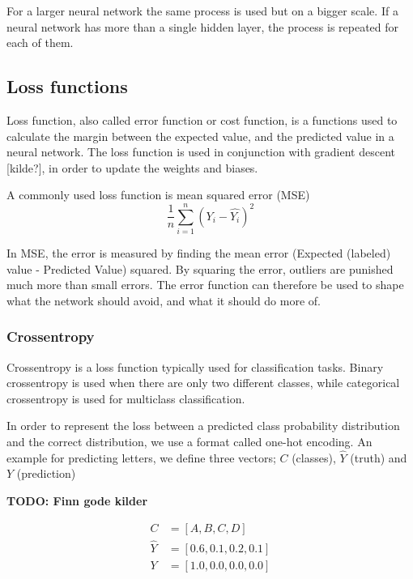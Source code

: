 For a larger neural network the same process is used but on a bigger scale. If a neural network has more than a single hidden layer, the process is repeated for each of them.

\subsection{Loss functions}
\label{loss_function}

Loss function, also called error function or cost function, is a functions used to calculate the margin between the expected value, and the predicted value in a neural network. The loss function is used in conjunction with gradient descent [kilde?], in order to update the weights and biases.

A commonly used loss function is mean squared error (MSE)
\begin{equation}
    \frac{1}{n} \sum^n_{i=1} (Y_i - \hat{Y_i})^2
\end{equation}

In MSE, the error is measured by finding the mean error (Expected (labeled) value - Predicted Value) squared. By squaring the error, outliers are punished much more than small errors. The error function can therefore be used to shape what the network should avoid, and what it should do more of.

\subsubsection{Crossentropy}
\label{categorical-crossentropy}

Crossentropy is a loss function typically used for classification tasks. Binary crossentropy is used when there are only two different classes, while categorical crossentropy is used for multiclass classification.

In order to represent the loss between a predicted class probability distribution and the correct distribution, we use a format called one-hot encoding. An example for predicting letters, we define three vectors; $C$ (classes), $\hat{Y}$ (truth) and $Y$ (prediction)

\textbf{TODO: Finn gode kilder}


\begin{equation} \label{eqn:catcross_ex1}
\begin{split}
    C &= [A, B, C, D] \\
    \hat{Y} &= [0.6, 0.1, 0.2, 0.1] \\
    Y &= [1.0, 0.0, 0.0, 0.0]
\end{split}
\end{equation}

